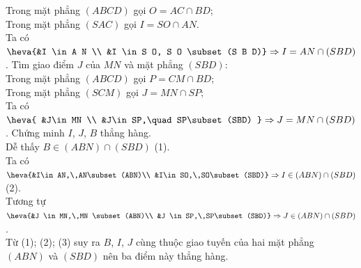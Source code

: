 \begin{ex}
{\begin{itemchoice}
			Trong mặt  phẳng $(A B C D)$ gọi $O=A C \cap B D$;\\
			Trong mặt phẳng $(SAC)$ gọi $I=S O  \cap A N$.\\
			Ta có $\heva{&I \in A N \\  &I \in S O, S O \subset(S B D)} \Rightarrow I=A N \cap(S B D)$.
			\itemch Tìm giao  điểm $J$ của $M N$ và mặt phẳng $(S B D)$:\\
			Trong mặt phẳng $(A B C D)$ gọi $P = C M \cap B D$;\\ 
			Trong  mặt phẳng $(S C M)$ gọi $J = M N \cap S P$;\\
			 Ta có $\heva{
			 &J\in MN \\
			&J\in SP,\quad  SP\subset (SBD)
			} \Rightarrow J=MN\cap (SBD)$. 
			 \itemch Chứng minh $I$, $J$, $B$ thẳng hàng.\\
			 Dễ thấy $B\in(ABN) \cap(SBD)$ (1).\\
			Ta  có $\heva{&I\in AN,\,AN\subset(ABN)\\ &I\in SO,\,SO\subset(SBD)}\Rightarrow I\in(ABN) \cap(SBD)$ (2).\\
			Tương tự $\heva{&J \in MN,\,MN \subset(ABN)\\ &J \in SP,\,SP\subset(SBD)} \Rightarrow J \in(ABN)  \cap(SBD)$.\\
			Từ (1); (2); (3) suy ra $B$, $I$, $J$ cùng thuộc giao tuyến của hai mặt phẳng $(ABN)$  và $(SBD)$ nên ba điểm này thẳng hàng.
		\end{itemchoice}
	} 
\end{ex}

